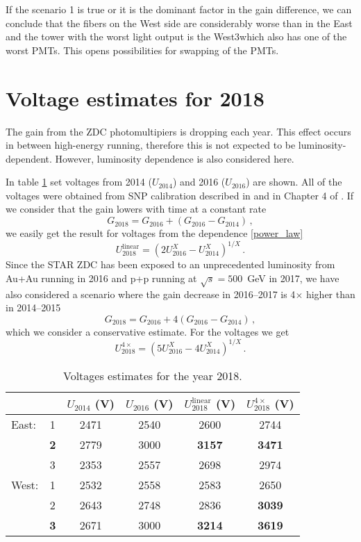 \documentclass[a4paper,10pt]{article}
\begin{document}
If the scenario 1 is true or it is the dominant factor in the gain difference, we can conclude that the fibers on the West side are considerably worse than in the East and the tower with the worst light output is the West3\@ which also has one of the worst PMTs. This opens possibilities for swapping of the PMTs.

\section{Voltage estimates for 2018}
The gain from the ZDC photomultipiers is dropping each year. This effect occurs in between high-energy running, therefore this is not expected to be luminosity-dependent. However, luminosity dependence is also considered here.

In table \ref{voltsTable} set voltages from 2014 ($U_{2014}$) and 2016 ($U_{2016}$) are shown. All of the voltages were obtained from SNP calibration described in \cite{calib2014} and in Chapter 4 of \cite{ZDC_ops_manual}\@. If we consider that the gain lowers with time at a constant rate
\begin{equation}
G_{2018} = G_{2016} + (G_{2016} - G_{2014})\,,
\end{equation}
we easily get the result for voltages from the dependence \eqref{power_law}
\begin{equation}
U_{2018}^\text{linear} = (2 U_{2016}^X - U_{2014}^X)^{1/X}\,.
\end{equation}
Since the STAR ZDC has been exposed to an unprecedented luminosity from Au+Au running in 2016 and p+p running at $\sqrt{s} = 500$~GeV in 2017, we have also considered a scenario where the gain decrease in 2016--2017 is 4$\times$ higher than in 2014--2015
\begin{equation}
G_{2018} = G_{2016} + 4(G_{2016} - G_{2014})\,,
\end{equation}
which we consider a conservative estimate. For the voltages we get
\begin{equation}
U_{2018}^{4\times} = (5 U_{2016}^X - 4 U_{2014}^X)^{1/X}\,.
\end{equation}

\begin{table}[htb]
\caption{\label{voltsTable}Voltages estimates for the year 2018.}
\begin{center}
\begin{tabular}{lccccc}
\toprule
&&$U_{2014}$ (V)&$U_{2016}$ (V)& $U_{2018}^\text{linear}$ (V)&$U_{2018}^{4\times}$ (V)\\
\midrule
East:&1&2471&2540&2600&2744\\
&\textbf{2}&2779&3000&\textbf{3157}&\textbf{3471}\\
&3&2353&2557&2698&2974\\
\midrule
West:&1&2532&2558&2583&2650\\
&2&2643&2748&2836&\textbf{3039}\\
&\textbf{3}&2671&3000&\textbf{3214}&\textbf{3619}\\
\bottomrule
\end{tabular}
\end{center}
\end{table}
\end{document}
